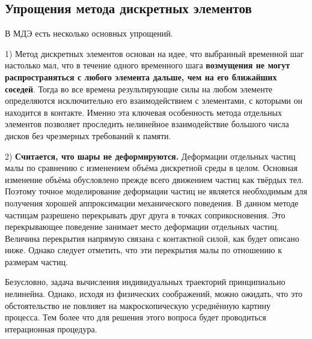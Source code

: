 \documentclass[a4paper]{article}
\begin{document}
\subsection{Упрощения метода дискретных элементов}
В МДЭ есть несколько основных упрощений. 

1) Метод дискретных элементов основан на идее, что выбранный временной шаг настолько мал, что в течение одного временного шага \textbf{возмущения не могут распространяться с любого элемента дальше, чем на его ближайших соседей}. 
Тогда во все времена результирующие силы на любом элементе определяются исключительно его взаимодействием с элементами, с которыми он находится в контакте.
Именно эта ключевая особенность метода отдельных элементов позволяет проследить нелинейное взаимодействие большого числа дисков без чрезмерных требований к памяти.

2) \textbf{Считается, что шары не деформируются.}
Деформации отдельных частиц малы по сравнению с изменением объёма дискретной среды в целом. 
Основная изменение объёма обусловлено прежде всего движением частиц как твёрдых тел. 
Поэтому точное моделирование деформации частиц не является необходимым для получения хорошей аппроксимации механического поведения. 
В данном методе частицам разрешено перекрывать друг друга в точках соприкосновения. 
Это перекрывающее поведение занимает место деформации отдельных частиц. 
Величина перекрытия напрямую связана с контактной силой, как будет описано ниже.
Однако следует отметить, что эти перекрытия малы по отношению к размерам частиц.

Безусловно, задача вычисления индивидуальных траекторий принципиально нелинейна.
Однако, исходя из физических соображений, можно ожидать, что это обстоятельство не повлияет на макроскопическую усреднённую картину процесса.
Тем более что для решения этого вопроса будет проводиться итерационная процедура.

\end{document}
